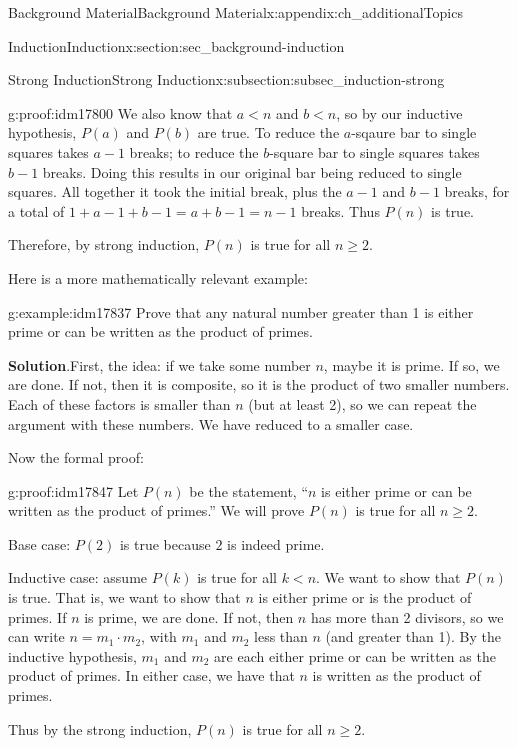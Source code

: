 \documentclass[oneside,10pt,]{book}
\numberwithin{equation}{chapter}
\newcommand{\lt}{<}
\begin{document}
\begin{appendixptx}{Background Material}{}{Background Material}{}{}{x:appendix:ch_additionalTopics}
\begin{sectionptx}{Induction}{}{Induction}{}{}{x:section:sec_background-induction}
\begin{subsectionptx}{Strong Induction}{}{Strong Induction}{}{}{x:subsection:subsec_induction-strong}
\begin{proofptx}{}{g:proof:idm17800}
We also know that \(a \lt n\) and \(b \lt n\), so by our inductive hypothesis, \(P(a)\) and \(P(b)\) are true.  To reduce the \(a\)-sqaure bar to single squares takes \(a-1\) breaks; to reduce the \(b\)-square bar to single squares takes \(b-1\) breaks.  Doing this results in our original bar being reduced to single squares.  All together it took the initial break, plus the \(a-1\) and \(b-1\) breaks, for a total of \(1+a-1+b-1 = a+b-1 = n-1\) breaks.  Thus \(P(n)\) is true.%
\par
Therefore, by strong induction, \(P(n)\) is true for all \(n \ge 2\).%
\end{proofptx}
Here is a more mathematically relevant example:%
\begin{example}{}{g:example:idm17837}%
Prove that any natural number greater than 1 is either prime or can be written as the product of primes.%
\par\smallskip%
\noindent\textbf{Solution}.\hypertarget{g:solution:idm17842}{}\quad{}First, the idea: if we take some number \(n\), maybe it is prime. If so, we are done. If not, then it is composite, so it is the product of two smaller numbers. Each of these factors is smaller than \(n\) (but at least 2), so we can repeat the argument with these numbers. We have reduced to a smaller case.%
\par
Now the formal proof:%
\begin{proofptx}{}{g:proof:idm17847}
Let \(P(n)\) be the statement, ``\(n\) is either prime or can be written as the product of primes.'' We will prove \(P(n)\) is true for all \(n \ge 2\).%
\par
Base case: \(P(2)\) is true because \(2\) is indeed prime.%
\par
Inductive case: assume \(P(k)\) is true for all \(k \lt  n\). We want to show that \(P(n)\) is true. That is, we want to show that \(n\) is either prime or is the product of primes. If \(n\) is prime, we are done. If not, then \(n\) has more than 2 divisors, so we can write \(n = m_1 \cdot m_2\), with \(m_1\) and \(m_2\) less than \(n\) (and greater than 1). By the inductive hypothesis, \(m_1\) and \(m_2\) are each either prime or can be written as the product of primes. In either case, we have that \(n\) is written as the product of primes.%
\par
Thus by the strong induction, \(P(n)\) is true for all \(n \ge 2\).%
\end{proofptx}
\end{example}

\end{subsectionptx}
\end{sectionptx}
\end{appendixptx}
\end{document}

